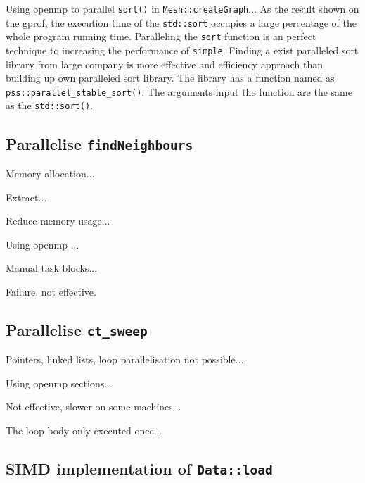 \documentclass[conference]{IEEEtran}
\begin{document}
Using openmp to parallel \texttt{sort()} in \texttt{Mesh::createGraph}...
As the result shown on the gprof, the execution time of the \texttt{std::sort} occupies a large percentage of the whole program running time. Paralleling the \texttt{sort} function is an perfect technique to increasing the performance of \texttt{simple}. Finding a exist paralleled sort library from large company is more effective and efficiency approach than building up own paralleled sort library. \cite{parallelsort} The library has a function named as \texttt{pss::parallel\_stable\_sort()}. The arguments input the function are the same as the \texttt{std::sort()}. 

\subsection{Parallelise \texttt{findNeighbours}}

Memory allocation...

Extract...

Reduce memory usage...

Using openmp \cite{dagum1998openmp}...

Manual task blocks...

Failure, not effective.

\subsection{Parallelise \texttt{ct\_sweep}}

Pointers, linked lists, loop parallelisation not possible...

Using openmp sections...

Not effective, slower on some machines...

The loop body only executed once...

\subsection{SIMD implementation of \texttt{Data::load}}
\end{document}
